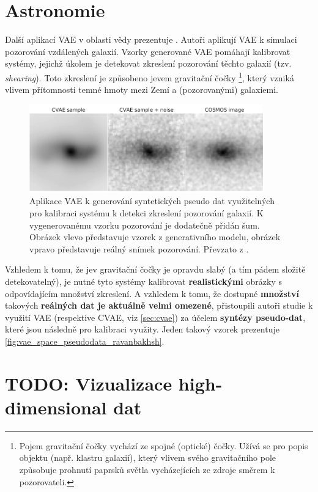 \newpage
\section{Astronomie}
\label{sec:applications_astronomy_pseudo_data_synthesis}
Další aplikací VAE v oblasti vědy prezentuje \textcite{Ravanbakhsh2016}.
Autoři aplikují VAE k simulaci pozorování vzdálených galaxií.
Vzorky generované VAE pomáhají kalibrovat systémy, jejichž úkolem je detekovat zkreslení pozorování těchto galaxií (tzv. \emph{shearing}). Toto zkreslení je způsobeno jevem gravitační čočky
\footnote{Pojem gravitační čočky vychází ze spojné (optické) čočky. Užívá se pro popis objektu (např. klastru galaxií), který vlivem svého gravitačního pole způsobuje prohnutí paprsků světla vycházejících ze zdroje směrem k pozorovateli.},
který vzniká vlivem přítomnosti temné hmoty mezi Zemí a (pozorovanými) galaxiemi. \cite{Kingma2019}

\begin{figure}[H]
    \centering
    \includegraphics[width=0.9\textwidth]{figures/applications/vae_space_pseudodata_ravanbakhsh.png}
    \caption{Aplikace VAE k generování syntetických pseudo dat využitelných pro kalibraci systému k detekci zkreslení pozorování galaxií. K vygenerovanému vzorku pozorování je dodatečně přidán šum. Obrázek vlevo představuje vzorek z generativního modelu, obrázek vpravo představuje reálný snímek pozorování. Převzato z \textcite{Ravanbakhsh2016}.}
    \label{fig:vae_space_pseudodata_ravanbakhsh}
\end{figure}


Vzhledem k tomu, že jev gravitační čočky je opravdu slabý (a tím pádem složitě detekovatelný), je nutné tyto systémy kalibrovat \textbf{realistickými} obrázky s odpovídajícím množství zkreslení.
A vzhledem k tomu, že dostupné \textbf{množství} takových \textbf{reálných dat je aktuálně velmi omezené}, přistoupili autoři studie k využití VAE (respektive CVAE, viz \autoref{sec:cvae}) za účelem \textbf{syntézy pseudo-dat}, které jsou následně pro kalibraci využity. Jeden takový vzorek prezentuje \autoref{fig:vae_space_pseudodata_ravanbakhsh}. \cite{Ravanbakhsh2016}

\section{TODO: Vizualizace high-dimensional dat}